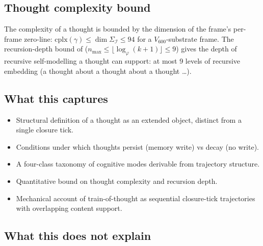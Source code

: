 \documentclass[11pt]{article}
\theoremstyle{plain}
\theoremstyle{definition}
\theoremstyle{remark}
\newcommand{\Ical}{\mathcal{I}}
\begin{document}
\subsection{Thought complexity bound}

The complexity of a thought is bounded by the dimension of the frame's per-frame zero-line: $\mathrm{cplx}(\gamma) \leq \dim \Sigma_\Ical \leq 94$ for a $V_{600}$-substrate frame. The recursion-depth bound of \citet{SmartExistenceClosure} ($n_{\max} \leq \lfloor \log_\varphi(k + 1) \rfloor \leq 9$) gives the depth of recursive self-modelling a thought can support: at most 9 levels of recursive embedding (a thought about a thought about a thought \ldots).

\subsection{What this captures}

\begin{itemize}[leftmargin=2em]
\item Structural definition of a thought as an extended object, distinct from a single closure tick.
\item Conditions under which thoughts persist (memory write) vs decay (no write).
\item A four-class taxonomy of cognitive modes derivable from trajectory structure.
\item Quantitative bound on thought complexity and recursion depth.
\item Mechanical account of train-of-thought as sequential closure-tick trajectories with overlapping content support.
\end{itemize}

\subsection{What this does not explain}
\end{document}
